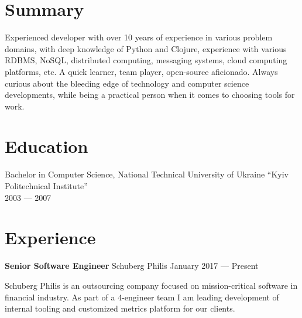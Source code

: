 \documentclass[margin]{res}
\begin{document}

\address{{\bf Mailing address} \\ Czaar Peterstraat 103B \\ 1018PE, Amsterdam \\ The Netherlands}

\address{{\bf Contacts} \\ +31 62 980 61 41 \\ contact@mishkovskyi.net \\ \href{https://github.com/mishok13}{mishok13@GitHub}}

\begin{resume}

\section{Summary}
Experienced developer with over 10 years of experience in various
problem domains, with deep knowledge of Python and Clojure, experience
with various RDBMS, NoSQL, distributed computing, messaging systems,
cloud computing platforms, etc. A quick learner, team player,
open-source aficionado. Always curious about the bleeding edge of
technology and computer science developments, while being a practical
person when it comes to choosing tools for work.

\section{Education}
Bachelor in Computer Science, National Technical University of Ukraine ``Kyiv Politechnical Institute'' \\
2003 --- 2007

\section{Experience}

{\bf Senior Software Engineer} Schuberg Philis \hfill January 2017 --- Present

Schuberg Philis is an outsourcing company focused on mission-critical
software in financial industry. As part of a 4-engineer team I am
leading development of internal tooling and customized metrics
platform for our clients.


\end{resume}
\end{document}
